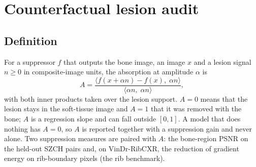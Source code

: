 \section{Counterfactual lesion audit}
\label{sec:audit}
\subsection{Definition}
For a suppressor $f$ that outputs the bone image, an image $x$ and a lesion signal $n\ge0$ in composite-image units, the absorption at amplitude
$\alpha$ is
\begin{equation}
A=\frac{\big\langle f(x+\alpha n)-f(x),\;\alpha n\big\rangle}{\big\langle \alpha n,\;\alpha n\big\rangle},
\label{eq:absorption}
\end{equation}
with both inner products taken over the lesion support. $A=0$ means that the lesion stays in the soft-tissue image and $A=1$ that it was removed with
the bone; $A$ is a regression slope and can fall outside $[0,1]$. A model that does nothing has $A=0$, so $A$ is reported together with a suppression
gain and never alone. Two suppression measures are paired with $A$: the bone-region PSNR on the held-out SZCH pairs and, on VinDr-RibCXR, the
reduction of gradient energy on rib-boundary pixels (the rib benchmark).

